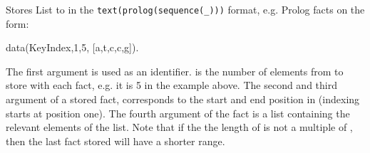 \begin{description}
Stores List to  in the \verb$text(prolog(sequence(_)))$ format, e.g. Prolog facts on the form:

\begin{code}
data(KeyIndex,1,5, [a,t,c,c,g]).
\end{code}

The first argument  is used as an identifier.
 is the number of elements from  to store with each fact, e.g. it is 5 in the example above.
The second and third argument of a stored fact, corresponds to the start and end position in  (indexing starts at position one).
The fourth argument of the fact is a list containing the relevant elements of the  list.
Note that if the the length of  is not a multiple of , then the last fact stored will have a shorter range.
\end{description}

